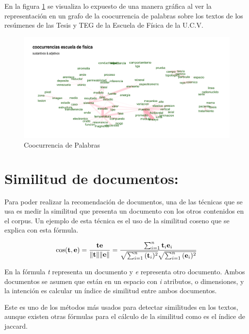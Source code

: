 \documentclass[
  10,
  openany]{book}
\begin{document}
En la figura \ref{fig:coocejem} se visualiza lo expuesto de una manera gráfica al ver la representación en un grafo de la coocurrencia de palabras sobre los textos de los resúmenes de las Tesis y TEG de la Escuela de Física de la U.C.V.

\begin{figure}

{\centering \includegraphics[width=0.9\linewidth]{images/03-marco-teorico/cooc} 

}

\caption{Coocurrencia de Palabras}\label{fig:coocejem}
\end{figure}

\hypertarget{similitud}{%
\section{Similitud de documentos:}\label{similitud}}

Para poder realizar la recomendación de documentos, una de las técnicas que se usa es medir la similitud que presenta un documento con los otros contenidos en el corpus. Un ejemplo de esta técnica es el uso de la similitud coseno que se explica con esta fórmula.

\begin{equation}
\cos ({\bf t},{\bf e})= {{\bf t} {\bf e} \over \|{\bf t}\| \|{\bf e}\|} = \frac{ \sum_{i=1}^{n}{{\bf t}_i{\bf e}_i} }{ \sqrt{\sum_{i=1}^{n}{({\bf t}_i)^2}} \sqrt{\sum_{i=1}^{n}{({\bf e}_i)^2}} }
\end{equation}

En la fórmula \emph{t} representa un documento y \emph{e} representa otro documento. Ambos documentos se asumen que están en un espacio con \emph{i} atributos, o dimensiones, y la intención es calcular un índice de similitud entre ambos documentos.

Este es uno de los métodos más usados para detectar similitudes en los textos, aunque existen otras fórmulas para el cálculo de la similitud como es el índice de jaccard.
\end{document}
